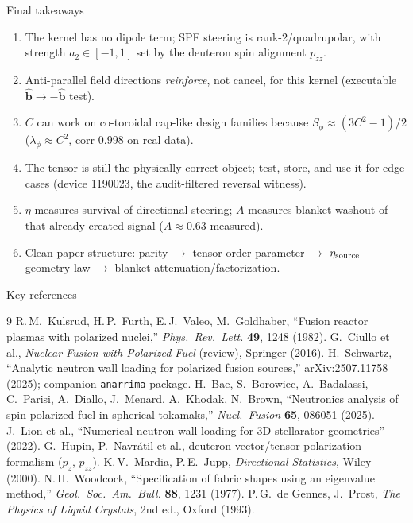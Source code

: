 \documentclass[aspectratio=169]{beamer}
\newcommand{\bb}{\hat{\bm b}}
\newcommand{\Sphi}{S_\phi}
\newcommand{\lamphi}{\lambda_\phi}
\begin{document}
\begin{frame}[t]{Final takeaways}
\begin{enumerate}
  \item The kernel has no dipole term; SPF steering is rank-2/quadrupolar, with strength $a_2\in[-1,1]$ set by the deuteron spin alignment $p_{zz}$.
  \item Anti-parallel field directions \emph{reinforce}, not cancel, for this kernel (executable $\bb\to-\bb$ test).
  \item $C$ can work on co-toroidal cap-like design families because $\Sphi\approx(3C^2-1)/2$ ($\lamphi\approx C^2$, corr $0.998$ on real data).
  \item The tensor is still the physically correct object; test, store, and use it for edge cases (device 1190023, the audit-filtered reversal witness).
  \item $\eta$ measures survival of directional steering; $A$ measures blanket washout of that already-created signal ($A\approx0.63$ measured).
  \item Clean paper structure: parity $\rightarrow$ tensor order parameter $\rightarrow$ $\eta_{\rm source}$ geometry law $\rightarrow$ blanket attenuation/factorization.
\end{enumerate}
\end{frame}

\begin{frame}[t,allowframebreaks]{Key references}
\footnotesize
\begin{thebibliography}{9}
 R.\,M.\ Kulsrud, H.\,P.\ Furth, E.\,J.\ Valeo, M.\ Goldhaber,
``Fusion reactor plasmas with polarized nuclei,'' \emph{Phys.\ Rev.\ Lett.} \textbf{49}, 1248 (1982).
 G.\ Ciullo et al., \emph{Nuclear Fusion with Polarized Fuel} (review), Springer (2016).
 H.\ Schwartz, ``Analytic neutron wall loading for polarized fusion sources,'' arXiv:2507.11758 (2025); companion \texttt{anarrima} package.
 H.\ Bae, S.\ Borowiec, A.\ Badalassi, C.\ Parisi, A.\ Diallo, J.\ Menard, A.\ Khodak, N.\ Brown,
``Neutronics analysis of spin-polarized fuel in spherical tokamaks,'' \emph{Nucl.\ Fusion} \textbf{65}, 086051 (2025).
 J.\ Lion et al., ``Numerical neutron wall loading for 3D stellarator geometries'' (2022).
 G.\ Hupin, P.\ Navr\'atil et al., deuteron vector/tensor polarization formalism ($p_z$, $p_{zz}$).
 K.\,V.\ Mardia, P.\,E.\ Jupp, \emph{Directional Statistics}, Wiley (2000).
 N.\,H.\ Woodcock, ``Specification of fabric shapes using an eigenvalue method,''
\emph{Geol.\ Soc.\ Am.\ Bull.} \textbf{88}, 1231 (1977).
 P.\,G.\ de Gennes, J.\ Prost, \emph{The Physics of Liquid Crystals}, 2nd ed., Oxford (1993).
\end{thebibliography}
\end{frame}
\end{document}
